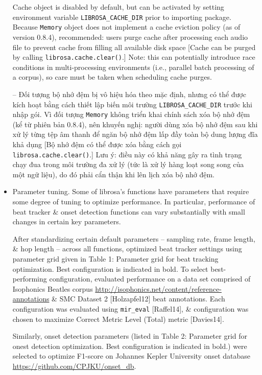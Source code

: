 \documentclass{article}
\begin{document}
\begin{itemize}
	Cache object is disabled by default, but can be activated by setting environment variable \verb|LIBROSA_CACHE_DIR| prior to importing package. Because {\tt Memory} object does not implement a cache eviction policy (as of version 0.8.4), recommended: users purge cache after processing each audio file to prevent cache from filling all available disk space [Cache can be purged by calling {\tt librosa.cache.clear()}.] Note: this can potentially introduce race conditions in multi-processing environments (i.e., parallel batch processing of a corpus), so care must be taken when scheduling cache purges.
	
	-- Đối tượng bộ nhớ đệm bị vô hiệu hóa theo mặc định, nhưng có thể được kích hoạt bằng cách thiết lập biến môi trường \verb|LIBROSA_CACHE_DIR| trước khi nhập gói. Vì đối tượng {\tt Memory} không triển khai chính sách xóa bộ nhớ đệm (kể từ phiên bản 0.8.4), nên khuyến nghị: người dùng xóa bộ nhớ đệm sau khi xử lý từng tệp âm thanh để ngăn bộ nhớ đệm lấp đầy toàn bộ dung lượng đĩa khả dụng [Bộ nhớ đệm có thể được xóa bằng cách gọi {\tt librosa.cache.clear()}.] Lưu ý: điều này có khả năng gây ra tình trạng chạy đua trong môi trường đa xử lý (tức là xử lý hàng loạt song song của một ngữ liệu), do đó phải cẩn thận khi lên lịch xóa bộ nhớ đệm.
	\item {\sf Parameter tuning.} Some of librosa's functions have parameters that require some degree of tuning to optimize performance. In particular, performance of beat tracker \& onset detection functions can vary substantially with small changes in certain key parameters.
	
	After standardizing certain default parameters -- sampling rate, frame length, \& hop length -- across all functions, optimized beat tracker settings using parameter grid given in {\sf Table 1: Parameter grid for beat tracking optimization. Best configuration is indicated in bold.} To select best-performing configuration, evaluated performance on a data set comprised of Isophonics Beatles corpus \url{http://isophonics.net/content/reference-annotations} \& SMC Dataset 2 [Holzapfel12] beat annotations. Each configuration was evaluated using \verb|mir_eval| [Raffel14], \& configuration was chosen to maximize Correct Metric Level (Total) metric [Davies14].
	
	Similarly, onset detection parameters (listed in {\sf Table 2: Parameter grid for onest detection optimization. Best configuration is indicated in bold.}) were selected to optimize F1-score on Johannes Kepler University onset database \url{https://github.com/CPJKU/onset_db}.
	

\end{itemize}
\end{document}
